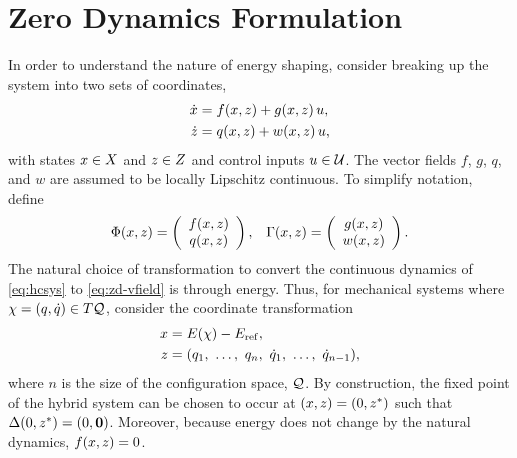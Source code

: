 \section{Zero Dynamics Formulation} \label{sec:zd-form}

In order to understand the nature of energy shaping, consider breaking up the system into two sets of coordinates,
%
\begin{align}
  \nonumber
  \dot {x} &= f(x, z) + g(x, z) \, u,\\
  \dot {z} &= q(x, z) + w(x, z) \, u,
  \label{eq:zd-vfield}
\end{align}
%
with states $x \in X$ and $z \in Z$ and control inputs $u \in \mathcal{U}$.
%
The vector fields $f$, $g$, $q$, and $w$ are assumed to be locally Lipschitz continuous.
%
To simplify notation, define
%
\begin{align}
  \Phi(x, z) = \left(\begin{array}{c}
    f(x, z)\\
    q(x, z)
  \end{array}\right),&&
  \Gamma (x, z) = \left(\begin{array}{c}
    g(x, z)\\
    w(x, z)
  \end{array}\right).
\end{align}
%
The natural choice of transformation to convert the continuous dynamics of \eqref{eq:hcsys} to \eqref{eq:zd-vfield} is through energy.
%
Thus, for mechanical systems where $\chi = (q, \dot{q}) \in T\mathcal{Q}$, consider the coordinate transformation
%
\begin{align}
  \nonumber
  x &= E(\chi) - E_{\mathrm{ref}},\\
  z &= (q_{1}, \ \ldots, \ q_{n}, \ \dot{q}_{1}, \ \ldots, \ \dot{q}_{n-1}),
\end{align}
where $n$ is the size of the configuration space, $\mathcal{Q}$.
%
By construction, the fixed point of the hybrid system can be chosen to occur at $(x, z) = (0, z^{*})$ such that $\Delta(0, z^{*}) = (0, {\mathbf 0})$.
%
Moreover, because energy does not change by the natural dynamics, $f(x, z) = 0$.
%

